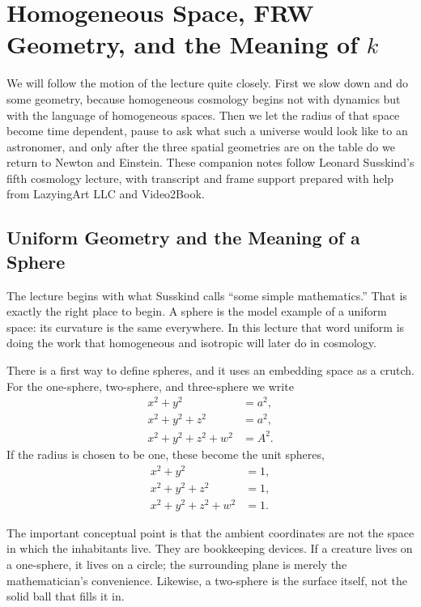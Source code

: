 \chapter{Homogeneous Space, FRW Geometry, and the Meaning of $k$}

We will follow the motion of the lecture quite closely. First we slow down and do some geometry, because homogeneous cosmology begins not with dynamics but with the language of homogeneous spaces. Then we let the radius of that space become time dependent, pause to ask what such a universe would look like to an astronomer, and only after the three spatial geometries are on the table do we return to Newton and Einstein. These companion notes follow Leonard Susskind's fifth cosmology lecture, with transcript and frame support prepared with help from LazyingArt LLC and Video2Book.

\section{Uniform Geometry and the Meaning of a Sphere}

The lecture begins with what Susskind calls ``some simple mathematics.'' That is exactly the right place to begin. A sphere is the model example of a uniform space: its curvature is the same everywhere. In this lecture that word uniform is doing the work that homogeneous and isotropic will later do in cosmology.

There is a first way to define spheres, and it uses an embedding space as a crutch. For the one-sphere, two-sphere, and three-sphere we write
\begin{align}
x^2+y^2 &= a^2, \\
x^2+y^2+z^2 &= a^2, \\
x^2+y^2+z^2+w^2 &= A^2.
\end{align}
If the radius is chosen to be one, these become the unit spheres,
\begin{align}
x^2+y^2 &= 1, \\
x^2+y^2+z^2 &= 1, \\
x^2+y^2+z^2+w^2 &= 1.
\end{align}

The important conceptual point is that the ambient coordinates are not the space in which the inhabitants live. They are bookkeeping devices. If a creature lives on a one-sphere, it lives on a circle; the surrounding plane is merely the mathematician's convenience. Likewise, a two-sphere is the surface itself, not the solid ball that fills it in.

